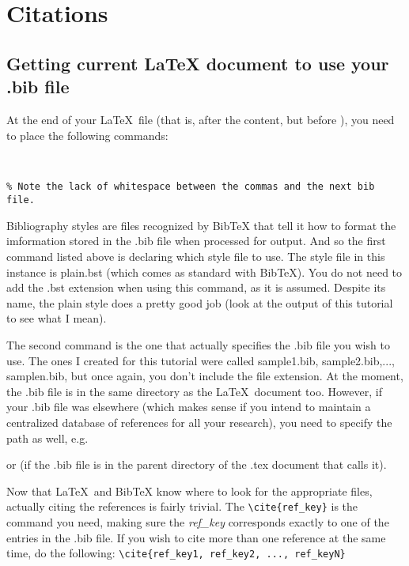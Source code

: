 
\chapter{Citations}
\section{Getting current \LaTeX{} document to use your .bib file}
At the end of your \LaTeX~file (that is, after the content, but before \lstinline[language={[LaTeX]TeX}]||), you need to place the following commands:

\begin{lstlisting}[language={[LaTeX]TeX}]


% Note the lack of whitespace between the commas and the next bib file.
\end{lstlisting}

Bibliography styles are files recognized by BibTeX that tell it how to format the imformation stored in the .bib file when processed for output. And so the first command listed above is declaring which style file to use. The style file in this instance is plain.bst (which comes as standard with BibTeX). You do not need to add the .bst extension when using this command, as it is assumed. Despite its name, the plain style does a pretty good job (look at the output of this tutorial to see what I mean).

The second command is the one that actually specifies the .bib file you wish to use. The ones I created for this tutorial were called sample1.bib, sample2.bib,..., samplen.bib, but once again, you don't include the file extension. At the moment, the .bib file is in the same directory as the \LaTeX~document too. However, if your .bib file was elsewhere (which makes sense if you intend to maintain a centralized database of references for all your research), you need to specify the path as well, e.g.

\lstinline[language={[LaTeX]TeX}]|| or \lstinline[language={[LaTeX]TeX}]|| (if the .bib file is in the parent directory of the .tex document that calls it).

Now that \LaTeX~and BibTeX know where to look for the appropriate files, actually citing the references is fairly trivial. The \lstinline[language={[LaTeX]TeX}]|\cite{ref_key}| is the command you need, making sure the \textit{ref\_key} corresponds exactly to one of the entries in the .bib file. If you wish to cite more than one reference at the same time, do the following: \lstinline[language={[LaTeX]TeX}]|\cite{ref_key1, ref_key2, ..., ref_keyN}|

